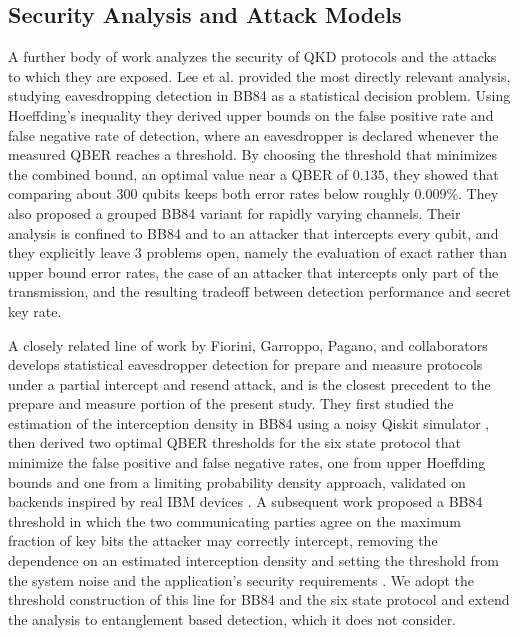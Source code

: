 \documentclass[conference]{IEEEtran}
\begin{document}
\subsection{Security Analysis and Attack Models}
A further body of work analyzes the security of QKD protocols and the attacks
to which they are exposed. Lee et al. \cite{lee2022eavesdropping} provided the
most directly relevant analysis, studying eavesdropping detection in BB84 as a
statistical decision problem. Using Hoeffding's inequality they derived upper
bounds on the false positive rate and false negative rate of detection, where
an eavesdropper is declared whenever the measured QBER reaches a threshold. By
choosing the threshold that minimizes the combined bound, an optimal value near
a QBER of $0.135$, they showed that comparing about 300 qubits keeps
both error rates below roughly 0.009\%. They also proposed a grouped BB84 variant for rapidly
varying channels. Their analysis is confined to BB84 and to an attacker that
intercepts every qubit, and they explicitly leave 3 problems open, namely
the evaluation of exact rather than upper bound error rates, the case of an
attacker that intercepts only part of the transmission, and the resulting
tradeoff between detection performance and secret key rate.

A closely related line of work by Fiorini, Garroppo, Pagano, and collaborators
develops statistical eavesdropper detection for prepare and measure protocols
under a partial intercept and resend attack, and is the closest precedent to the
prepare and measure portion of the present study. They first studied the
estimation of the interception density in BB84 using a noisy Qiskit simulator
\cite{fiorini2024estimating}, then derived two optimal QBER thresholds for the
six state protocol that minimize the false positive and false negative rates,
one from upper Hoeffding bounds and one from a limiting probability density
approach, validated on backends inspired by real IBM devices
\cite{fiorini2025sixstate}. A subsequent work proposed a BB84 threshold in which
the two communicating parties agree on the maximum fraction of key bits the
attacker may correctly intercept, removing the dependence on an estimated
interception density and setting the threshold from the system noise and the
application's security requirements \cite{fiorini2026threshold}. We adopt the
threshold construction of this line for BB84 and the six state protocol and
extend the analysis to entanglement based detection, which it does not consider.
\end{document}

